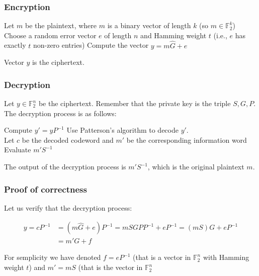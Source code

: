 \subsubsection{Encryption}

\begin{algorithm}
\begin{algorithmic}[1]
    \State Let $m$ be the plaintext, where $m$ is a binary vector of length $k$ (so $m \in \mathbb{F}_2^k$)
    \State Choose a random error vector $e$ of length $n$ and Hamming weight $t$ (i.e., $e$ has exactly $t$ non-zero entries)
    \State Compute the vector $y = m\hat{G} + e$
\end{algorithmic}
\end{algorithm}
\noindent
Vector $y$ is the ciphertext.

\subsubsection{Decryption}
Let $y \in \mathbb{F}_2^n$ be the ciphertext. Remember that the private key is the triple $S, G, P$. The decryption process is as follows:

\begin{algorithm}
\begin{algorithmic}[1]
    \State Compute $y' = yP^{-1}$
    \State Use Patterson's algorithm to decode $y'$. \\
    Let $c$ be the decoded codeword and $m'$ be the corresponding information word
    \State Evaluate $m'S^{-1}$
\end{algorithmic}
\end{algorithm}
\noindent
The output of the decryption process is $m'S^{-1}$, which is the original plaintext $m$.


\subsubsection *{Proof of correctness}
Let us verify that the decryption process:

\begin{align*}
    y = cP^{-1} &= (m\hat{G} + e)P^{-1} = mSGPP^{-1} + eP^{-1} = (mS)G + eP^{-1} \\
    &= m'G + f
\end{align*}

\noindent
For semplicity we have denoted $f = eP^{-1}$ (that is a vector in $\mathbb{F}_2^n$ with Hamming weight $t$) and $m' = mS$ (that is the vector in $\mathbb{F}_2^n$ 
\medskip

